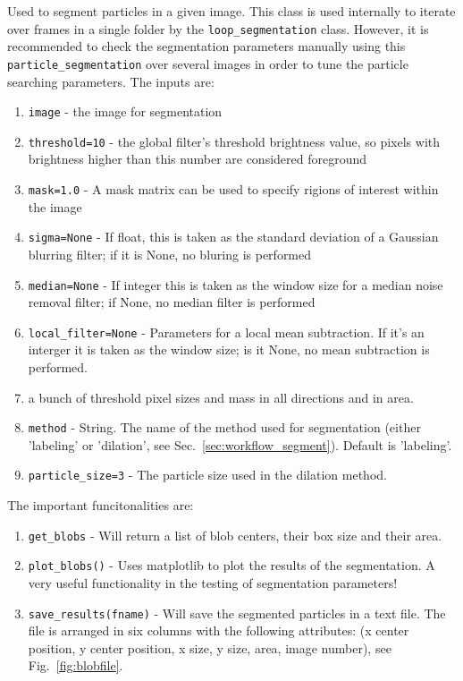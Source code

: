 \documentclass[10pt,a4paper]{article}
\begin{document}
Used to segment particles in a given image. This class is used internally to iterate over frames in a single folder by the \texttt{loop\_segmentation} class. However, it is recommended to check the segmentation parameters manually using this \texttt{particle\_segmentation} over several images in order to tune the particle searching parameters. The inputs are:
%
\begin{enumerate}
	\item \texttt{image} - the image for segmentation
	\item \texttt{threshold=10} - the global filter's threshold brightness value, so pixels with brightness higher than this number are considered foreground 
	\item \texttt{mask=1.0} - A mask matrix can be used to specify rigions of interest within the image
	\item \texttt{sigma=None} - If float, this is taken as the standard deviation of a Gaussian blurring filter; if it is None, no bluring is performed
	\item \texttt{median=None} - If integer this is taken as the window size for a median noise removal filter; if None, no median filter is performed
	\item \texttt{local\_filter=None} - Parameters for a local mean subtraction. If it's an interger it is taken as the window size; is it None, no mean subtraction is performed.
	\item a bunch of threshold pixel sizes and mass in all directions and in area.
	\item \texttt{method} - String. The name of the method used for segmentation (either 'labeling' or 'dilation', see Sec.~\ref{sec:workflow_segment}). Default is 'labeling'.
	\item \texttt{particle\_size=3} - The particle size used in the dilation method.
\end{enumerate}


The important funcitonalities are:
%
\begin{enumerate}
	\item \texttt{get\_blobs} - Will return a list of blob centers, their box size and their area.
	
	\item \texttt{plot\_blobs()} - Uses matplotlib to plot the results of the segmentation. A very useful functionality in the testing of segmentation parameters!
	
	\item \texttt{save\_results(fname)} - Will save the segmented particles in a text file. The file is arranged in six columns with the following attributes: (x center position, y center position, x size, y size, area, image number), see Fig.~\ref{fig:blobfile}.
\end{enumerate}
\end{document}

